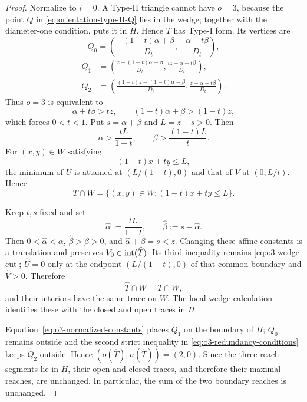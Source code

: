 \begin{proof}
Normalize to $i=0$.  A Type-II triangle cannot have $o=3$, because the point
$Q$ in \eqref{eq:orientation-type-II-Q} lies in the wedge; together with the
diameter-one condition,  puts it in $H$.  Hence
$T$ has Type-I form.  Its vertices are
\[
 Q_0=\left(-\frac{(1-t)\alpha+\beta}{D_t},
           -\frac{\alpha+t\beta}{D_t}\right),
\]
\begin{equation}
\begin{aligned}
 Q_1&=\left(\frac{z-(1-t)\alpha-\beta}{D_t},
             \frac{tz-\alpha-t\beta}{D_t}\right),\\
 Q_2&=\left(\frac{(1-t)z-(1-t)\alpha-\beta}{D_t},
             \frac{z-\alpha-t\beta}{D_t}\right).
\end{aligned}
\label{eq:o3-type-I-vertices}
\end{equation}
Thus $o=3$ is equivalent to
\begin{equation}
 \alpha+t\beta>tz,\qquad
 (1-t)\alpha+\beta>(1-t)z,
 \label{eq:o3-outside-conditions}
\end{equation}
which forces $0<t<1$.  Put $s=\alpha+\beta$ and $L=z-s>0$.  Then
\begin{equation}
 \alpha>\frac{tL}{1-t},\qquad
 \beta>\frac{(1-t)L}{t}.
 \label{eq:o3-redundancy-conditions}
\end{equation}
For $(x,y)\in W$ satisfying
\begin{equation}
 (1-t)x+ty\le L,
 \label{eq:o3-wedge-cut}
\end{equation}
the minimum of $U$ is attained at $(L/(1-t),0)$ and that of $V$ at
$(0,L/t)$.  Hence
\begin{equation}
 T\cap W=\{(x,y)\in W:(1-t)x+ty\le L\}.
 \label{eq:o3-wedge-trace}
\end{equation}

Keep $t,s$ fixed and set
\begin{equation}
 \widehat\alpha:=\frac{tL}{1-t},\qquad
 \widehat\beta:=s-\widehat\alpha.
 \label{eq:o3-normalized-constants}
\end{equation}
Then $0<\widehat\alpha<\alpha$, $\widehat\beta>\beta>0$, and
$\widehat\alpha+\widehat\beta=s<z$.  Changing these affine constants is a
translation and preserves $V_0\in\mathrm{int}(\widehat T)$.  Its third
inequality remains \eqref{eq:o3-wedge-cut}; $\widehat U=0$ only at the
endpoint $(L/(1-t),0)$ of that common boundary and $\widehat V>0$.  Therefore
\[
 \widehat T\cap W=T\cap W,
\]
and their interiors have the same trace on $W$.  The local wedge calculation
identifies these with the closed and open traces in $H$.

Equation~\eqref{eq:o3-normalized-constants} places $Q_1$ on the boundary of
$H$; $Q_0$ remains outside and the second strict inequality in
\eqref{eq:o3-redundancy-conditions} keeps $Q_2$ outside.  Hence
$(o(\widehat T),n(\widehat T))=(2,0)$.  Since the three reach segments lie in
$H$, their open and closed traces, and therefore their maximal reaches, are
unchanged. In particular, the sum of the two boundary reaches is unchanged.
\end{proof}

